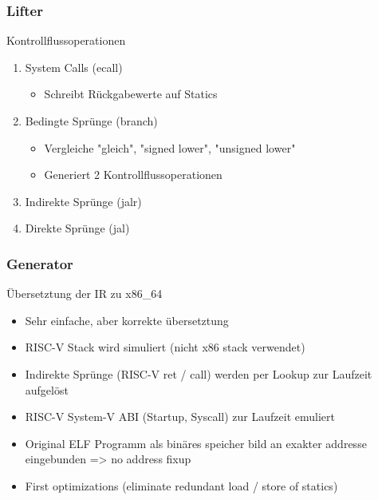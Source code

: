 \note[itemize]{

}


\begin{frame}
    \frametitle{Lifter}{Kontrollflussoperationen}

    \begin{enumerate}
        \setlength\itemsep{0.5em}
        \item System Calls (ecall)
        \begin{itemize}
            \item Schreibt Rückgabewerte auf Statics
        \end{itemize}
        \item Bedingte Sprünge (branch)
        \begin{itemize}
            \item Vergleiche "gleich", "signed lower", "unsigned lower"
            \item Generiert 2 Kontrollflussoperationen
        \end{itemize}
        \item Indirekte Sprünge (jalr)
        \item Direkte Sprünge (jal)
    \end{enumerate}
\end{frame}
\clearpage

\note[itemize]{

}


\begin{frame}
    \frametitle{Generator}{Übersetztung der IR zu x86\_64}

    \begin{itemize}
        \item Sehr einfache, aber korrekte übersetztung
        \item RISC-V Stack wird simuliert (nicht x86 stack verwendet)
        \item Indirekte Sprünge (RISC-V ret / call) werden per Lookup zur Laufzeit aufgelöst
        \item RISC-V System-V ABI (Startup, Syscall) zur Laufzeit emuliert
        \item Original ELF Programm als binäres speicher bild an exakter addresse eingebunden => no address fixup
        \item First optimizations (eliminate redundant load / store of statics)
    \end{itemize}
\end{frame}
\clearpage

